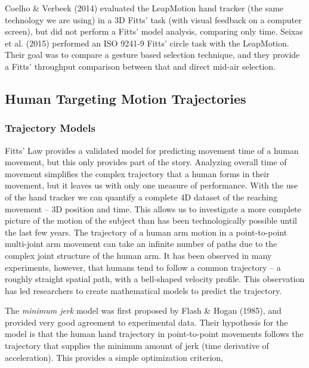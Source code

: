 Coelho \& Verbeek (2014) evaluated the LeapMotion hand tracker (the same technology we are using) in a 3D Fitts' task (with visual feedback on a computer screen), but did not perform a Fitts' model analysis, comparing only time. Seixas et al. (2015) performed an ISO 9241-9 Fitts' circle task with the LeapMotion. Their goal was to compare a gesture based selection technique, and they provide a Fitts' throughput comparison between that and direct mid-air selection.

\subsection{Human Targeting Motion Trajectories}
\label{human-targeting-motion-trajectories}

\subsubsection{Trajectory Models}\label{trajectory-models}

Fitts' Law provides a validated model for predicting movement time of a human movement, but this only provides part of the story. Analyzing overall time of movement simplifies the complex trajectory that a human forms in their movement, but it leaves us with only one measure of performance. With the use of the hand tracker we can quantify a complete 4D dataset of the reaching movement -- 3D position and time. This allows us to investigate a more complete picture of the motion of the subject than has been technologically possible until the last few years. The trajectory of a human arm motion in a point-to-point multi-joint arm movement can take an infinite number of paths due to the complex joint structure of the human arm. It has been observed in many experiments, however, that humans tend to follow a common trajectory -- a roughly straight spatial path, with a bell-shaped velocity profile. This observation has led researchers to create mathematical models to predict the trajectory.

The \emph{minimum jerk} model was first proposed by Flash \& Hogan (1985), and provided very good agreement to experimental data. Their hypothesis for the model is that the human hand trajectory in point-to-point movements follows the trajectory that supplies the minimum amount of jerk (time derivative of acceleration). This provides a simple optimization criterion,


